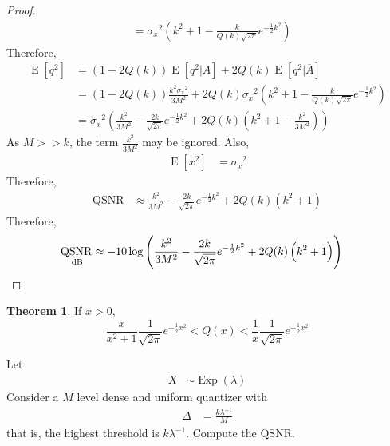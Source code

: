 \documentclass[titlepage, fleqn, a4paper, 12pt, twoside]{article}
\theoremstyle{definition}
\theoremstyle{theorem}
\newtheorem{theorem}{Theorem}
\DeclareMathOperator{\expct}{\mathrm{E}}
\DeclareMathOperator{\exponential}{\mathrm{Exp}}
\DeclareMathOperator{\QSNR}{\mathrm{QSNR}}
\begin{document}
\begin{proof}
\begin{align*}
		&= {\sigma_x}^2 \left( k^2 + 1 - \frac{k}{Q(k) \sqrt{2 \pi}} e^{-\frac{1}{2} k^2} \right)
	\end{align*}
	Therefore,
	\begin{align*}
		\expct\left[ q^2 \right] &= \left( 1 - 2 Q(k) \right) \expct\left[ q^2 \Big| A \right] + 2 Q(k) \expct\left[ q^2 \Big| \overline{A} \right]\\
		&= \left( 1 - 2 Q(k) \right) \frac{k^2 {\sigma_x}^2}{3 M^2} + 2 Q(k) {\sigma_x}^2 \left( k^2 + 1 - \frac{k}{Q(k) \sqrt{2 \pi}} e^{-\frac{1}{2} k^2} \right)\\
		&= {\sigma_x}^2 \left( \frac{k^2}{3 M^2} - \frac{2 k}{\sqrt{2 \pi}} e^{-\frac{1}{2} k^2} + 2 Q(k) \left( k^2 + 1 - \frac{k^2}{3 M^2} \right) \right)
	\end{align*}
	As $M >> k$, the term $\frac{k^2}{3 M^2}$ may be ignored.
	Also,
	\begin{align*}
		\expct\left[ x^2 \right] &= {\sigma_x}^2
	\end{align*}
	Therefore,
	\begin{align*}
		\QSNR &\approx \frac{k^2}{3 M^2} - \frac{2 k}{\sqrt{2 \pi}} e^{-\frac{1}{2} k^2} + 2 Q(k) \left( k^2 + 1 \right)
	\end{align*}
	Therefore,
	\begin{align*}
		\QSNR_{\decibel} &\approx -10 \log\left( \frac{k^2}{3 M^2} - \frac{2 k}{\sqrt{2 \pi}} e^{-\frac{1}{2} k^2} + 2 Q(k) \left( k^2 + 1 \right) \right)
	\end{align*}
\end{proof}

\begin{theorem}
	If $x > 0$,
	\begin{equation*}
		\frac{x}{x^2 + 1} \frac{1}{\sqrt{2 \pi}} e^{-\frac{1}{2} x^2} < Q(x) < \frac{1}{x} \frac{1}{\sqrt{2 \pi}} e^{-\frac{1}{2} x^2}
	\end{equation*}
\end{theorem}

\begin{question}
	Let
	\begin{align*}
		X &\sim \exponential(\lambda)
	\end{align*}
	Consider a $M$ level dense and uniform quantizer with
	\begin{align*}
		\Delta &= \frac{k \lambda^{-1}}{M}
	\end{align*}
	that is, the highest threshold is $k \lambda^{-1}$.
	Compute the QSNR.
\end{question}
\end{document}
